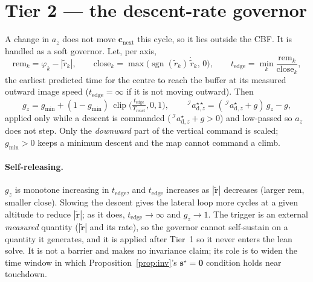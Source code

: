 \documentclass[11pt]{article}
\newcommand{\Iframe}{\mathcal{I}}
\begin{document}
\section{Tier 2 --- the descent-rate governor}\label{sec:tier2}
A change in $a_z$ does not move $\boldsymbol{c}_\text{next}$ this cycle, so it lies outside the CBF. It is
handled as a soft governor. Let, per axis,
\begin{equation}\label{eq:tedge}
\text{rem}_k=\varphi_k-|\tilde r_k|,\qquad
\text{close}_k=\max\!\big(\operatorname{sgn}(\tilde r_k)\,\dot{\tilde r}_k,\,0\big),\qquad
t_\text{edge}=\min_k \frac{\text{rem}_k}{\text{close}_k},
\end{equation}
the earliest predicted time for the centre to reach the buffer at its measured outward image speed
($t_\text{edge}=\infty$ if it is not moving outward). Then
\begin{equation}\label{eq:gz}
\boxed{\;
g_z=g_\text{min}+(1-g_\text{min})\,\operatorname{clip}\!\Big(\tfrac{t_\text{edge}}{T_\text{react}},0,1\Big),
\qquad
\,^\Iframe a_{\text{d},z}^{\star\star}=(\,^\Iframe a_{\text{d},z}^\star+g)\,g_z-g,
\;}
\end{equation}
applied only while a descent is commanded ($\,^\Iframe a_{\text{d},z}^\star+g>0$) and low-passed so $a_z$
does not step. Only the \emph{downward} part of the vertical command is scaled; $g_\text{min}>0$ keeps a
minimum descent and the map cannot command a climb.

\paragraph{Self-releasing.} $g_z$ is monotone increasing in $t_\text{edge}$, and $t_\text{edge}$
increases as $|\tilde{\boldsymbol{r}}|$ decreases (larger $\text{rem}$, smaller $\text{close}$). Slowing
the descent gives the lateral loop more cycles at a given altitude to reduce $|\tilde{\boldsymbol{r}}|$;
as it does, $t_\text{edge}\to\infty$ and $g_z\to1$. The trigger is an external \emph{measured} quantity
($|\tilde{\boldsymbol{r}}|$ and its rate), so the governor cannot self-sustain on a quantity it
generates, and it is applied after Tier~1 so it never enters the lean solve. It is not a barrier and
makes no invariance claim; its role is to widen the time window in which Proposition~\ref{prop:inv}'s
$\boldsymbol{s}^\star=\boldsymbol{0}$ condition holds near touchdown.
\end{document}
